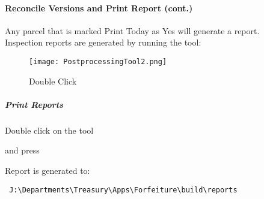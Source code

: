  \clearpage


 \paragraph*{Reconcile Versions and Print Report {\footnotesize (cont.)}}

 \vspace{.5in}

Any parcel that is marked Print Today as Yes will generate a report.\\ 
 
\noindent Inspection reports are generated by running the tool:

\begin{wrapfigure}{r}{0.6\textwidth}

\centering
     \texttt{[image: PostprocessingTool2.png]}
 \caption{Double Click}
 \end{wrapfigure}

 
 \vspace{2in}
 
 \subparagraph{Print Reports}
 
 \noindent Double click on the tool
 
 \noindent and press {\btn{}}
 
 \noindent Report is generated to: 
 
 
 \begin{verbatim}
 J:\Departments\Treasury\Apps\Forfeiture\build\reports
 \end{verbatim}

 \clearpage


%
%
%
%
%
%
%
%
%
%
%
%
%
%
%

